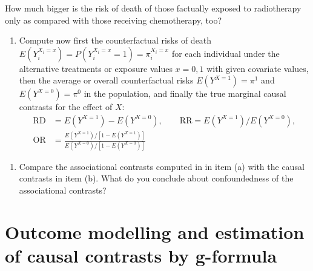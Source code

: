 \documentclass[
]{book}
\newenvironment{Shaded}{\begin{snugshade}}{\end{snugshade}}
\newcommand{\AttributeTok}[1]{\textcolor[rgb]{0.13,0.29,0.53}{#1}}
\newcommand{\DecValTok}[1]{\textcolor[rgb]{0.00,0.00,0.81}{#1}}
\newcommand{\FunctionTok}[1]{\textcolor[rgb]{0.13,0.29,0.53}{\textbf{#1}}}
\newcommand{\NormalTok}[1]{#1}
\newcommand{\OtherTok}[1]{\textcolor[rgb]{0.56,0.35,0.01}{#1}}
\newcommand{\SpecialCharTok}[1]{\textcolor[rgb]{0.81,0.36,0.00}{\textbf{#1}}}
\providecommand{\tightlist}{%
  \setlength{\itemsep}{0pt}\setlength{\parskip}{0pt}}
\begin{document}
How much bigger is the risk of death of those factually exposed
to radiotherapy only as compared with those receiving chemotherapy, too?

\begin{enumerate}
\def\labelenumi{\arabic{enumi}.}
\setcounter{enumi}{1}
\tightlist
\item
  Compute now first the counterfactual risks of death
  \(E(Y_i^{X_i=x}) = P(Y_i^{X_i=x}=1) = \pi_i^{X_i=x}\)
  for each individual
  under the alternative treatments or exposure values \(x=0,1\)
  with given covariate values, then
  the average or overall counterfactual risks \(E(Y^{X=1}) = \pi^1\)
  and \(E(Y^{X=0}) = \pi^0\) in the population,
  and finally the true marginal causal contrasts for the effect of \(X\):
  \[
  \begin{aligned}
   \text{RD} & = E(Y^{X=1})-E(Y^{X=0}), \qquad  \text{RR} = E(Y^{X=1})/E(Y^{X=0}), \\
   \text{OR} & = \frac{E(Y^{X=1})/[1 -  E(Y^{X=1})]}{E(Y^{X=0})/[1 -  E(Y^{X=0})] }
  \end{aligned}
  \]
\end{enumerate}

\begin{Shaded}
\end{Shaded}

\begin{enumerate}
\def\labelenumi{\arabic{enumi}.}
\setcounter{enumi}{2}
\tightlist
\item
  Compare the associational contrasts computed in in item (a) with the
  causal contrasts in item (b). What do you conclude about confoundedness of the associational contrasts?
\end{enumerate}

\section{Outcome modelling and estimation of causal contrasts by g-formula}\label{outcome-modelling-and-estimation-of-causal-contrasts-by-g-formula}
\end{document}
